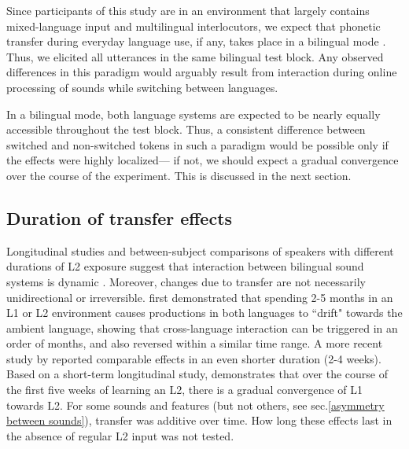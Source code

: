 \documentclass[12 pt]{article}
\begin{document}
Since participants of this study are in an environment that largely contains mixed-language input and multilingual interlocutors, we expect that phonetic transfer during everyday language use, if any, takes place in a bilingual mode \citep[see][]{grosjean1998studying}. Thus, we elicited all utterances in the same bilingual test block. Any observed differences in this paradigm would arguably result from interaction during online processing of sounds while switching between languages. 

In a bilingual mode, both language systems are expected to be nearly equally accessible throughout the test block. Thus, a consistent difference between switched and non-switched tokens in such a paradigm would be possible only if the effects were highly localized--- if not, we should expect a gradual convergence over the course of the experiment. This is discussed in the next section.


\subsection{Duration of transfer effects} \label{duration}

Longitudinal studies and between-subject comparisons of speakers with different durations of L2 exposure suggest that interaction between bilingual sound systems is dynamic \citep[e.g.][]{bohn1992production}. Moreover, changes due to transfer are not necessarily unidirectional or irreversible. \citet[][VOT]{sancier1997gestural} first demonstrated that spending 2-5 months in an L1 or L2 environment causes productions in both languages to ``drift" towards the ambient language, showing that cross-language interaction can be triggered in an order of months, and also reversed within a similar time range. A more recent study by \citet[][VOT]{tobin2017phonetic} reported comparable effects in an even shorter duration (2-4 weeks). Based on a short-term longitudinal study, \citet[][VOT]{chang2012rapid} demonstrates that over the course of the first five weeks of learning an L2, there is a gradual convergence of L1 towards L2. For some sounds and features (but not others, see sec.\ref{asymmetry between sounds}), transfer was additive over time. How long these effects last in the absence of regular L2 input was not tested. 
\end{document}
